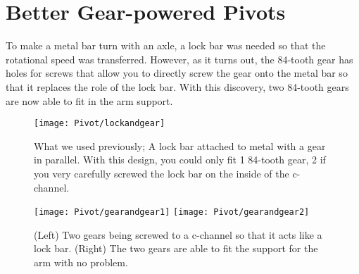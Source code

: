 \section{Better Gear-powered Pivots}

To make a metal bar turn with an axle, a lock bar was needed so that the rotational speed was transferred. However, as it turns out, the 84-tooth gear has holes for screws that allow you to directly screw the gear onto the metal bar so that it replaces the role of the lock bar. With this discovery, two 84-tooth gears are now able to fit in the arm support.

\begin{figure}[h]
    \centering
    \texttt{[image: Pivot/lockandgear]}
    \caption{
        What we used previously; A lock bar attached to metal with a gear in parallel. With this design, you could only fit 1 84-tooth gear, 2 if you very carefully screwed the lock bar on the inside of the c-channel.
    }
\end{figure}

\begin{figure}[h]
    \centering
    \texttt{[image: Pivot/gearandgear1]}
    \texttt{[image: Pivot/gearandgear2]}
    \caption{
        (Left) Two gears being screwed to a c-channel so that it acts like a lock bar. (Right) The two gears are able to fit the support for the arm with no problem.
    }
\end{figure}

